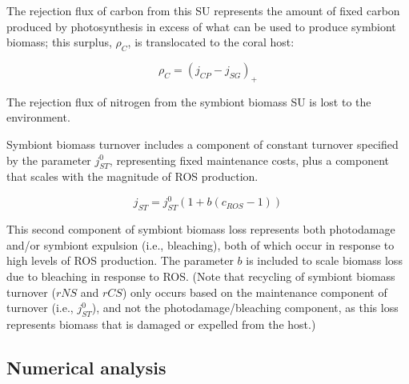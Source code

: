 \documentclass[]{elsarticle} %
\begin{document}
The rejection flux of carbon from this SU represents the amount of fixed
carbon produced by photosynthesis in excess of what can be used to
produce symbiont biomass; this surplus, \(\rho_C\), is translocated to
the coral host:

\begin{equation} \rho_C = (j_{CP} - j_{SG})_+ \end{equation}

The rejection flux of nitrogen from the symbiont biomass SU is lost to
the environment.

Symbiont biomass turnover includes a component of constant turnover
specified by the parameter \(j_{ST}^0\), representing fixed maintenance
costs, plus a component that scales with the magnitude of ROS
production.

\begin{equation} j_{ST} = j_{ST}^0(1 + b(c_{ROS}-1)) \end{equation}

This second component of symbiont biomass loss represents both
photodamage and/or symbiont expulsion (i.e., bleaching), both of which
occur in response to high levels of ROS production. The parameter \(b\)
is included to scale biomass loss due to bleaching in response to ROS.
(Note that recycling of symbiont biomass turnover (\(rNS\) and \(rCS\))
only occurs based on the maintenance component of turnover (i.e.,
\(j_{ST}^0\)), and not the photodamage/bleaching component, as this loss
represents biomass that is damaged or expelled from the host.)

\subsection{Numerical analysis}\label{numerical-analysis}
\end{document}
